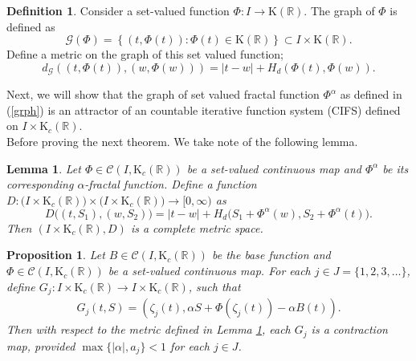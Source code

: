 \documentclass[12pt,oneside,reqno]{amsart}
\newtheorem{lemma}[theorem]{Lemma}
\newtheorem{proposition}[theorem]{Proposition}
\theoremstyle{definition}
\newtheorem{definition}[theorem]{Definition}
\theoremstyle{remark}
\begin{document}
 \begin{definition} \label{newg}
 Consider a set-valued function $\Phi:I\rightarrow \mathrm{K}(\mathbb{R})$. The graph of $\Phi$ is defined as
 \begin{equation}\label{grph}
    \mathcal{G}(\Phi)=\left\{(t,\Phi(t)): \Phi(t)\in \mathrm{K}(\mathbb{R}) \right\}\subset I\times \mathrm{K}(\mathbb{R}).  
   \end{equation}
     Define a metric on the graph of this set valued function; \[d_{\mathcal{G}}((t,\Phi(t)),(w,\Phi(w)))=\lvert t-w\rvert+H_d(\Phi(t),\Phi(w)).\]
   \end{definition}
   Next, we will show that the graph of set valued fractal function $\Phi^{\alpha}$ as defined in (\ref{grph}) is an attractor of an countable iterative function system (CIFS) defined on $I\times \mathrm{K}_c(\mathbb{R})$.\\
Before proving the next theorem. We take note of the following lemma.

 \begin{lemma} \cite{Ver21} \label{lemma5.1}
Let $\Phi\in \mathcal{C}(I, \mathrm{K}_c(\mathbb{R}))$ be a set-valued continuous map and $\Phi^{\alpha}$ be its corresponding $\alpha$-fractal function. Define a function $D:\big(I\times \mathrm{K}_c(\mathbb{R})\big) \times \big(I\times \mathrm{K}_c(\mathbb{R})\big) \rightarrow [0, \infty)$ as
 \[D\big((t,S_1),(w,S_2)\big)=\lvert t-w \rvert+H_d\big(S_1+\Phi^{\alpha}(w),S_2+\Phi^{\alpha}(t)\big).\]
  Then $(I\times \mathrm{K}_c(\mathbb{R}),D)$ is a complete metric space.
 \end{lemma}

 \begin{proposition}\label{prop5.6}
Let $B\in \mathcal{C}(I, \mathrm{K}_c(\mathbb{R}))$ be the base function and $\Phi\in \mathcal{C}(I, \mathrm{K}_c(\mathbb{R}))$ be a set-valued continuous map. For each $j\in J=\{1,2,3,\ldots\}$, define $G_{j}: I \times \mathrm{K}_c(\mathbb{R})\rightarrow I \times \mathrm{K}_c(\mathbb{R})$, such that
 \begin{equation*}\label{cifs}
     \begin{aligned}
 G_{j}(t,S)=\left(\zeta_{j}(t), \alpha S+\Phi(\zeta_{j}(t))-\alpha B(t)\right).
  \end{aligned}
 \end{equation*}
 Then with respect to the metric defined in Lemma \ref{lemma5.1}, each $G_j$ is a contraction map, provided $\max\{\lvert \alpha \rvert,a_j\}<1$ for each $j\in J$.
 \end{proposition}
 
\end{document}
